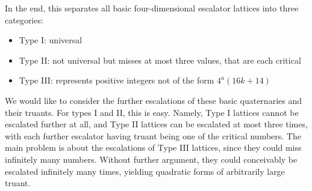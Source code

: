 \documentclass{article}
\begin{document}
In the end, this separates all basic four-dimensional escalator lattices into three categories:
\begin{itemize}
    \item Type I: universal
    \item Type II: not universal but misses at most three values, that are each critical
    \item Type III: represents positive integers not of the form $4^a(16k+14)$
\end{itemize}
We would like to consider the further escalations of these basic quaternaries and their truants.
For types I and II, this is easy.
Namely, Type I lattices cannot be escalated further at all, and Type II lattices can be escalated at most three times, with each further escalator having truant being one of the critical numbers.
The main problem is about the escalations of Type III lattices, since they could miss infinitely many numbers. Without further argument, they could conceivably be escalated infinitely many times, yielding quadratic forms of arbitrarily large truant.
\end{document}
